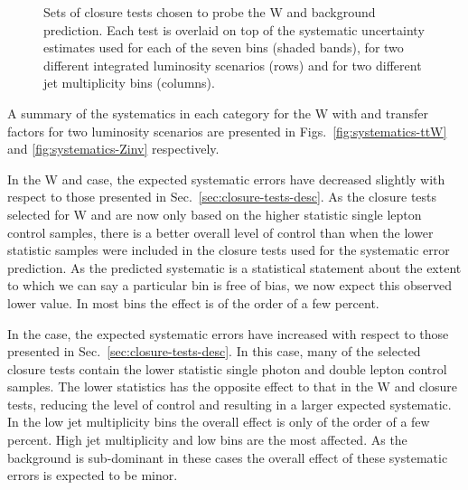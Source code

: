 \begin{figure}[h!]
\begin{center}
    \caption{Sets of closure tests chosen to probe the W and \ttbar
      background prediction. Each test is overlaid on top of
      the systematic uncertainty estimates used for each of the seven
      \scalht bins (shaded bands), for two different integrated
      luminosity scenarios (rows) and for two different jet
      multiplicity bins (columns).}
    \label{fig:ZinvClosure}
  \end{center} 
\end{figure}

A summary of the systematics in each category for the W with \ttbar 
and \znunu transfer factors for two luminosity scenarios are presented in
Figs.~\ref{fig:systematics-ttW} and \ref{fig:systematics-Zinv}
respectively. 

In the W and \ttbar case, the expected systematic errors have decreased 
slightly with respect to those presented in
Sec.~\ref{sec:closure-tests-desc}. As the
closure tests selected for W and \ttbar are now only based on the higher
statistic single lepton control samples, there is a better overall level of
control than when the lower statistic samples were included in the
closure tests used for the systematic error prediction. As the
predicted systematic is a statistical statement about the
extent to which we can say a particular bin is free of bias, we now 
expect this observed lower value. In most bins the
effect is of the order of a few percent.

In the \znunu case, the expected systematic errors have increased with
respect to those presented in Sec.~\ref{sec:closure-tests-desc}. In
this case, many of the selected closure tests contain the lower
statistic single photon and double lepton control samples. The lower
statistics has the opposite effect to that in the W and \ttbar closure 
tests, reducing the level of control and resulting in a larger
expected systematic. In the low jet multiplicity bins the overall
effect is only of the order of a few percent. High jet multiplicity
and low \scalht bins are the most affected. As the \znunu
background is sub-dominant in these cases the overall effect of these
systematic errors is expected to be minor.


